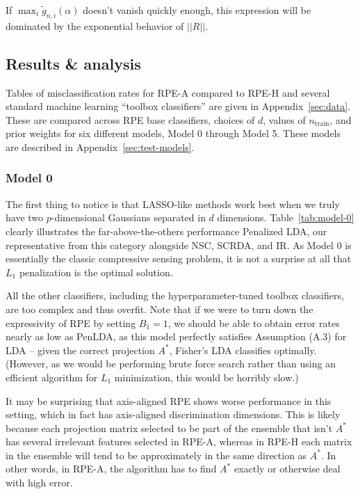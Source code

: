 \documentclass{amsart}
\begin{document}
If $\max_i\tilde{g}_{n,i}(\alpha)$ doesn't vanish quickly enough, this
expression will be dominated by the exponential behavior of $||R||$.


\subsection{Results \& analysis}

Tables of misclassification rates for RPE-A compared to RPE-H and several standard machine learning ``toolbox classifiers'' are given in Appendix~\ref{sec:data}.
These are compared across RPE base classifiers, choices of $d$, values of $n_\mathrm{train}$, and prior weights for six different models, Model 0 through Model 5.
These models are described in Appendix~\ref{sec:test-models}.

\subsubsection{Model 0}

The first thing to notice is that LASSO-like methods work best when we truly have two $p$-dimensional Gaussians separated in $d$ dimensions.
Table~\ref{tab:model-0} clearly illustrates the far-above-the-others performance Penalized LDA, our representative from this category alongside NSC, SCRDA, and IR.
As Model 0 is essentially the classic compressive sensing problem, it is not a surprise at all that $L_1$ penalization is the optimal solution.

All the other classifiers, including the hyperparameter-tuned toolbox classifiers, are too complex and thus overfit. Note that if we were to turn down
the expressivity of RPE by setting $B_1=1$, we should be able to obtain error rates nearly as low as PenLDA, as this model perfectly satisfies Assumption (A.3) for
LDA -- given the correct projection $A^*$, Fisher's LDA classifies optimally.
(However, as we would be performing brute force search rather than using an efficient algorithm for $L_1$ minimization, this would be horribly slow.)

It may be surprising that axis-aligned RPE shows worse performance in this setting, which in fact has axis-aligned discrimination dimensions.
This is likely because each projection matrix selected to be part of the ensemble that isn't $A^*$ has several irrelevant features selected in RPE-A,
whereas in RPE-H each matrix in the ensemble will tend to be approximately in the same direction as $A^*$. In other words, in RPE-A,
the algorithm has to find $A^*$ exactly or otherwise deal with high error.
\end{document}
